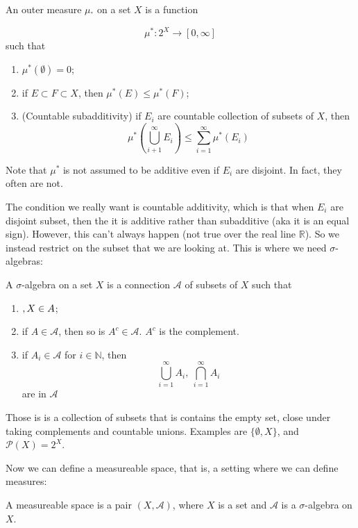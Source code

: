 \documentclass[main.tex]{subfiles}
\begin{document}
\begin{definition}
An outer measure $\mu_^*$ on a set $X$ is a function 

$$
\mu^* : 2^X \rightarrow [0, \infty]
$$ 
such that 
\begin{enumerate}
    \item $\mu^*(\emptyset) = 0$;
    \item if $E \subset F \subset X$, then $\mu^*(E) \leq \mu^*(F)$;
    \item (Countable subadditivity) if $E_i$ are countable collection of subsets of $X$, then 
    $$
    \mu^*(\bigcup_{i + 1} ^{\infty} E_i)\leq \sum_{i = 1} ^{\infty} \mu^*(E_i)
    $$
\end{enumerate}
\end{definition}
Note that $\mu^*$ is not assumed to be additive even if ${E_i}$ are disjoint. In fact, they often are not.

The condition we really want is countable additivity, which is that when $E_i$ are disjoint subset, then the it is additive rather than subadditive (aka it is an equal sign). However, this can't always happen (not true over the real line $\mathbb{R}$). So we instead restrict on the subset that we are looking at. This is where we need $\sigma$-algebras:

\begin{definition}
A $\sigma$-algebra on a set $X$ is a connection $\mathcal{A}$ of subsets of $X$ such that
\begin{enumerate}
    \item $\empty, X \in A$;
    \item if $A \in \mathcal{A}$, then so is $A^c \in \mathcal{A}$. $A^c$ is the complement.
    \item if $A_i \in \mathcal{A}$ for $i \in \mathbb{N}$, then 
    $$
    \bigcup_{i=1} ^{\infty} A_i,  \ \bigcap_{i=1} ^{\infty} A_i
    $$
    are in $\mathcal{A}$
\end{enumerate}
\end{definition}
Those is is a collection of subsets that is contains the empty set, close under taking complements and countable unions.
Examples are $\{ \emptyset, X \}$, and $\mathcal{P}(X) = 2^X$.

Now we can define a measureable space, that is, a setting where we can define measures:

\begin{definition}
A measureable space is a pair $(X, \mathcal{A})$, where $X$ is a set and $\mathcal{A}$ is a $\sigma$-algebra on $X$.
\end{definition}
\end{document}
